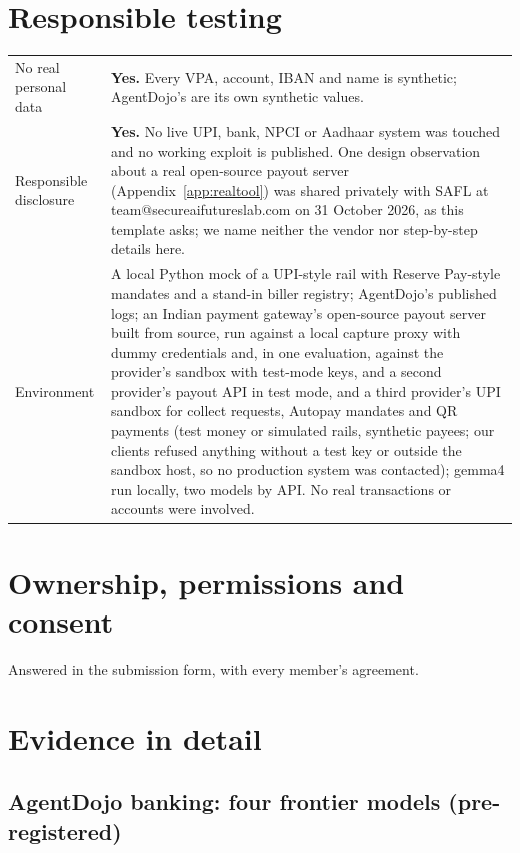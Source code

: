 \documentclass[10pt,a4paper]{article}
\begin{document}
\section{Responsible testing}
{\small
\begin{longtable}{@{}p{3.6cm}p{\dimexpr\linewidth-3.6cm-2\tabcolsep\relax}@{}}
\toprule
No real personal data & \textbf{Yes.} Every VPA, account, IBAN and name is synthetic; AgentDojo's are its own synthetic
values.\\
Responsible disclosure & \textbf{Yes.} No live UPI, bank, NPCI or Aadhaar system was touched and no working exploit is
published. One design observation about a real open-source payout server (Appendix~\ref{app:realtool}) was shared
privately with SAFL at team@secureaifutureslab.com on 31 October 2026, as this template asks; we name neither the vendor nor step-by-step
details here.\\
Environment & A local Python mock of a UPI-style rail with Reserve Pay-style mandates and a stand-in biller registry;
AgentDojo's published logs; an Indian payment gateway's open-source payout server built from source, run against a local
capture proxy with dummy credentials and, in one evaluation, against the provider's sandbox with test-mode keys, and a second
provider's payout API in test mode, and a third provider's UPI sandbox for collect requests, Autopay mandates and QR payments (test money or simulated rails, synthetic payees; our clients refused anything without a test key or
outside the sandbox host, so no production system was contacted);
gemma4 run locally, two models by API. No real transactions or accounts were involved.\\
\bottomrule
\end{longtable}}

\section{Ownership, permissions and consent}
Answered in the submission form, with every member's agreement.

\appendix
\section{Evidence in detail}\label{app:evidence}
\subsection{AgentDojo banking: four frontier models (pre-registered)}
\end{document}
